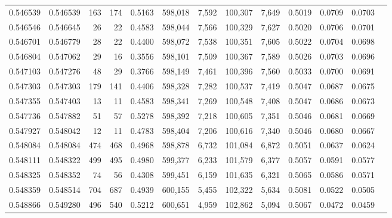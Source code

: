 \begin{tabular}{rrrrrrrrrrrrr}
0.546539 & 0.546539 &   163 &   174 &                                     0.5163 & 598,018 &   7,592 & 100,307 &   7,649 & 0.5019 & 0.0709 & 0.0703 \\
0.546546 & 0.546645 &    26 &    22 &                                     0.4583 & 598,044 &   7,566 & 100,329 &   7,627 & 0.5020 & 0.0706 & 0.0701 \\
0.546701 & 0.546779 &    28 &    22 &                                     0.4400 & 598,072 &   7,538 & 100,351 &   7,605 & 0.5022 & 0.0704 & 0.0698 \\
0.546804 & 0.547062 &    29 &    16 &                                     0.3556 & 598,101 &   7,509 & 100,367 &   7,589 & 0.5026 & 0.0703 & 0.0696 \\
0.547103 & 0.547276 &    48 &    29 &                                     0.3766 & 598,149 &   7,461 & 100,396 &   7,560 & 0.5033 & 0.0700 & 0.0691 \\
0.547303 & 0.547303 &   179 &   141 &                                     0.4406 & 598,328 &   7,282 & 100,537 &   7,419 & 0.5047 & 0.0687 & 0.0675 \\
0.547355 & 0.547403 &    13 &    11 &                                     0.4583 & 598,341 &   7,269 & 100,548 &   7,408 & 0.5047 & 0.0686 & 0.0673 \\
0.547736 & 0.547882 &    51 &    57 &                                     0.5278 & 598,392 &   7,218 & 100,605 &   7,351 & 0.5046 & 0.0681 & 0.0669 \\
0.547927 & 0.548042 &    12 &    11 &                                     0.4783 & 598,404 &   7,206 & 100,616 &   7,340 & 0.5046 & 0.0680 & 0.0667 \\
0.548084 & 0.548084 &   474 &   468 &                                     0.4968 & 598,878 &   6,732 & 101,084 &   6,872 & 0.5051 & 0.0637 & 0.0624 \\
0.548111 & 0.548322 &   499 &   495 &                                     0.4980 & 599,377 &   6,233 & 101,579 &   6,377 & 0.5057 & 0.0591 & 0.0577 \\
0.548325 & 0.548352 &    74 &    56 &                                     0.4308 & 599,451 &   6,159 & 101,635 &   6,321 & 0.5065 & 0.0586 & 0.0571 \\
0.548359 & 0.548514 &   704 &   687 &                                     0.4939 & 600,155 &   5,455 & 102,322 &   5,634 & 0.5081 & 0.0522 & 0.0505 \\
0.548866 & 0.549280 &   496 &   540 &                                     0.5212 & 600,651 &   4,959 & 102,862 &   5,094 & 0.5067 & 0.0472 & 0.0459 \\

\end{tabular}
